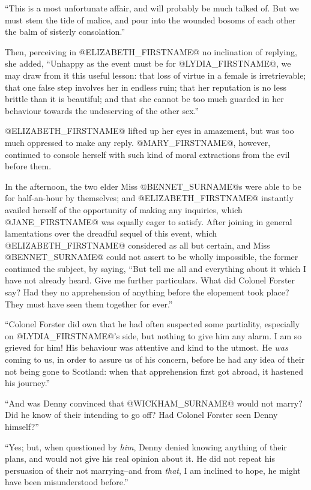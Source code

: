 ``This is a most unfortunate affair, and will probably be much talked of.
But we must stem the tide of malice, and pour into the wounded bosoms of
each other the balm of sisterly consolation.''

Then, perceiving in @ELIZABETH_FIRSTNAME@ no inclination of replying, she added,
``Unhappy as the event must be for @LYDIA_FIRSTNAME@, we may draw from it this useful
lesson: that loss of virtue in a female is irretrievable; that one
false step involves her in endless ruin; that her reputation is no less
brittle than it is beautiful; and that she cannot be too much guarded in
her behaviour towards the undeserving of the other sex.''

@ELIZABETH_FIRSTNAME@ lifted up her eyes in amazement, but was too much oppressed
to make any reply. @MARY_FIRSTNAME@, however, continued to console herself with such
kind of moral extractions from the evil before them.

In the afternoon, the two elder Miss @BENNET_SURNAME@s were able to be for
half-an-hour by themselves; and @ELIZABETH_FIRSTNAME@ instantly availed herself of
the opportunity of making any inquiries, which @JANE_FIRSTNAME@ was equally eager to
satisfy. After joining in general lamentations over the dreadful sequel
of this event, which @ELIZABETH_FIRSTNAME@ considered as all but certain, and Miss
@BENNET_SURNAME@ could not assert to be wholly impossible, the former continued
the subject, by saying, ``But tell me all and everything about it which
I have not already heard. Give me further particulars. What did Colonel
Forster say? Had they no apprehension of anything before the elopement
took place? They must have seen them together for ever.''

``Colonel Forster did own that he had often suspected some partiality,
especially on @LYDIA_FIRSTNAME@'s side, but nothing to give him any alarm. I am so
grieved for him! His behaviour was attentive and kind to the utmost. He
\textit{was} coming to us, in order to assure us of his concern, before he had
any idea of their not being gone to Scotland: when that apprehension
first got abroad, it hastened his journey.''

``And was Denny convinced that @WICKHAM_SURNAME@ would not marry? Did he know of
their intending to go off? Had Colonel Forster seen Denny himself?''

``Yes; but, when questioned by \textit{him}, Denny denied knowing anything of
their plans, and would not give his real opinion about it. He did not
repeat his persuasion of their not marrying--and from \textit{that}, I am
inclined to hope, he might have been misunderstood before.''

